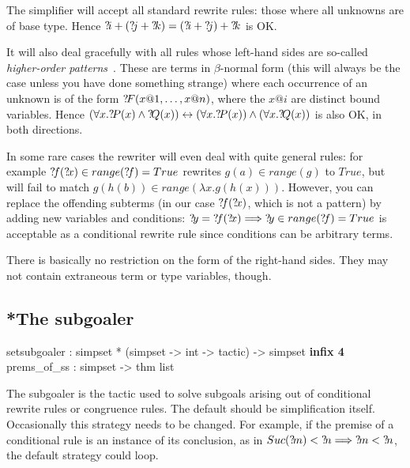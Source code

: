 \begin{warn}
  The simplifier will accept all standard rewrite rules: those where
  all unknowns are of base type.  Hence ${{?\!i}+({?\!j}+{?\!k})} =
  {({?\!i}+{?\!j})+{?\!k}}$ is OK.
  
  It will also deal gracefully with all rules whose left-hand sides
  are so-called {\em higher-order patterns}~\cite{nipkow-patterns}.
  These are terms in $\beta$-normal form (this will always be the case
  unless you have done something strange) where each occurrence of an
  unknown is of the form ${?\!F}(x@1,\dots,x@n)$, where the $x@i$ are
  distinct bound variables. Hence $(\forall x.{?\!P}(x) \land
  {?\!Q}(x)) \leftrightarrow (\forall x.{?\!P}(x)) \land (\forall
  x.{?\!Q}(x))$ is also OK, in both directions.
  
  In some rare cases the rewriter will even deal with quite general
  rules: for example ${{?\!f}({?\!x})\in range({?\!f})} = True$
  rewrites $g(a) \in range(g)$ to $True$, but will fail to match
  $g(h(b)) \in range(\lambda x.g(h(x)))$.  However, you can replace
  the offending subterms (in our case ${?\!f}({?\!x})$, which is not
  a pattern) by adding new variables and conditions: ${?\!y} =
  {?\!f}({?\!x}) \Longrightarrow {?\!y}\in range({?\!f}) = True$ is
  acceptable as a conditional rewrite rule since conditions can be
  arbitrary terms.
  
  There is basically no restriction on the form of the right-hand
  sides.  They may not contain extraneous term or type variables,
  though.
\end{warn}


\subsection{*The subgoaler}\label{sec:simp-subgoaler}
\begin{ttbox}
setsubgoaler :
  simpset *  (simpset -> int -> tactic) -> simpset \hfill{\bf infix 4}
prems_of_ss  : simpset -> thm list
\end{ttbox}

The subgoaler is the tactic used to solve subgoals arising out of
conditional rewrite rules or congruence rules.  The default should be
simplification itself.  Occasionally this strategy needs to be
changed.  For example, if the premise of a conditional rule is an
instance of its conclusion, as in $Suc({?\!m}) < {?\!n} \Longrightarrow {?\!m}
< {?\!n}$, the default strategy could loop.

